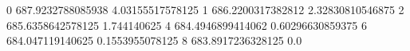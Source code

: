 0 687.9232788085938 4.03155517578125
1 686.2200317382812 2.32830810546875
2 685.6358642578125 1.744140625
4 684.4946899414062 0.60296630859375
6 684.047119140625 0.1553955078125
8 683.8917236328125 0.0

